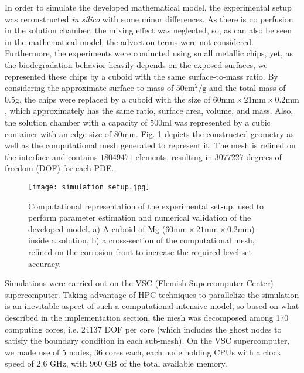 
In order to simulate the developed mathematical model, the experimental setup was reconstructed \textit{in silico} with some minor differences. As there is no perfusion in the solution chamber, the mixing effect was neglected, so, as can also be seen in the mathematical model, the advection terms were not considered. Furthermore, the experiments were conducted using small metallic chips, yet, as the biodegradation behavior heavily depends on the exposed surfaces, we represented these chips by a cuboid with the same surface-to-mass ratio. By considering the approximate surface-to-mass of $50 \mathrm{cm}^2/\mathrm{g}$ and the total mass of $0.5 \mathrm{g}$, the chips were replaced by a cuboid with the size of $60\mathrm{mm} \times 21\mathrm{mm} \times 0.2 \mathrm{mm}$, which approximately has the same ratio, surface area, volume, and mass. Also, the solution chamber with a capacity of $500 \mathrm{ml}$ was represented by a cubic container with an edge size of $80 \mathrm{mm}$. Fig. \ref{fig:simulation_setup} depicts the constructed geometry as well as the computational mesh generated to represent it. The mesh is refined on the interface and contains $\num{18049471}$ elements, resulting in $\num{3077227}$ degrees of freedom (\gls{DOF}) for each \gls{PDE}.

\begin{figure}[h]
\centering
\medskip
\texttt{[image: simulation\_setup.jpg]}
\caption[Simulation setup of the biodegradation tests]{Computational representation of the experimental set-up, used to perform parameter estimation and numerical validation of the developed model. a) A cuboid of Mg ($60 \mathrm{mm} \times 21 \mathrm{mm} \times 0.2 \mathrm{mm}$) inside a solution, b) a cross-section of the computational mesh, refined on the corrosion front to increase the required level set accuracy.} \label{fig:simulation_setup}
\end{figure}


Simulations were carried out on the VSC (Flemish Supercomputer Center) supercomputer. Taking advantage of \gls{HPC} techniques to parallelize the simulation is an inevitable aspect of such a computational-intensive model, so based on what described in the implementation section, the mesh was decomposed among 170 computing cores, i.e. $\num{24137}$ \gls{DOF} per core (which includes the ghost nodes to satisfy the boundary condition in each sub-mesh). On the VSC supercomputer, we made use of 5 nodes, 36 cores each, each node holding \gls{CPU}s with a clock speed of 2.6 GHz, with 960 GB of the total available memory.

